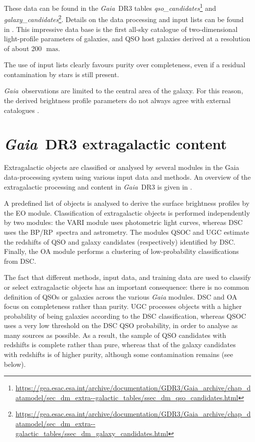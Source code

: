 \documentclass[longauth]{aa}
\makeatletter
\providecommand{\bprp}{BP/RP\xspace}
\providecommand{\mas}{\ensuremath{\,\mathrm{mas}}\xspace}
\newcommand\gaia{\textit{Gaia}\xspace}
\providecommand\gdrthree{\textit{Gaia}~DR3\xspace}
\providecommand\gdr[1]{\textit{Gaia}~DR#1\xspace}
\providecommand{\linktodoc}{https://gea.esac.esa.int/archive/documentation/GDR3}
\providecommand{\extragal}[1]{\url{\linktodoc/Gaia_archive/chap_datamodel/sec_dm_extra--galactic_tables/ssec_dm_#1.html}}%
\DeclareRobustCommand*{\fieldName}[1]{%
  \begingroup\@fieldName\scantokens{\texttt{\small {#1}}\noexpand}\endgroup}
\makeatother
\begin{document}
These data can be found in the \gdrthree tables \textit{qso\_candidates}\footnote{\extragal{qso_candidates}} and \textit{galaxy\_candidates}\footnote{\extragal{galaxy_candidates}}. Details on the data processing and input lists can be found in \cite{DR3-DPACP-153}.  This impressive data base is the first all-sky catalogue of  two-dimensional light-profile parameters of  galaxies,  and QSO host galaxies derived at a resolution of about 200~\mas.

 The use of input lists clearly  favours purity over completeness, even if a residual contamination by stars is still present.

\gaia\ observations are limited to  the central area of the galaxy. For this reason, the derived brightness profile parameters do not always agree with external catalogues \citep{DR3-DPACP-127, DR3-DPACP-153}.


\section{\gdrthree extragalactic content}\label{ssec:QSOs}
Extragalactic  objects  are  classified  or  analysed  by  several modules  in  the Gaia data-processing  system using various input data and methods. An overview of the extragalactic processing and content in \gdr{3} is given in \cite{DR3-DPACP-101}.

A predefined list of objects is analysed to derive the surface brightness profiles by the EO module. 
Classification of extragalactic objects  is performed independently by two modules: the VARI module uses photometric light curves, whereas DSC uses the \bprp\ spectra and astrometry. The modules QSOC and UGC estimate the redshifts of QSO and galaxy candidates (respectively) identified by DSC. Finally, the OA module performs a clustering of low-probability classifications from DSC.
 
The fact that different methods, input data, and training data are used to classify or select extragalactic objects has an important consequence: there is no common definition of QSOs or galaxies across the various \gaia modules.
DSC and OA focus on completeness rather than purity.
UGC processes objects with a higher probability of being galaxies according to the DSC classification, whereas QSOC uses a very low threshold on the DSC QSO probability, in order to analyse as many sources as possible. As a result, the sample of QSO candidates with redshifts is complete rather than pure, whereas that of the galaxy candidates with redshifts is of higher purity, although some contamination remains (see below).
 
\end{document}
